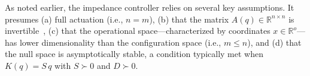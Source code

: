 As noted earlier, the impedance controller relies on several key assumptions. It presumes (a) full actuation (i.e., $n = m$), (b) that the matrix $A(q) \in \mathbb{R}^{n \times n}$ is invertible~\citep{della2020model}, (c) that the operational space—characterized by coordinates $x \in \mathbb{R}^{o}$—has lower dimensionality than the configuration space (i.e., $m \leq n$), and (d) that the null space is asymptotically stable, a condition typically met when $K(q) = S \, q$ with $S \succ 0$ and $D \succ 0$.

